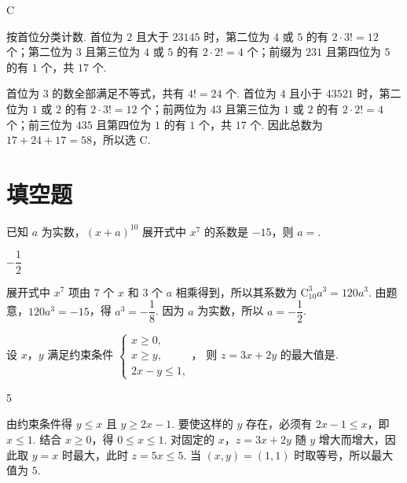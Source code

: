 \begin{answer}
C
\end{answer}

\begin{solution}
按首位分类计数. 首位为 \(2\) 且大于 \(23145\) 时，第二位为 \(4\) 或 \(5\) 的有 \(2\cdot3!=12\) 个；第二位为 \(3\) 且第三位为 \(4\) 或 \(5\) 的有 \(2\cdot2!=4\) 个；前缀为 \(231\) 且第四位为 \(5\) 的有 \(1\) 个，共 \(17\) 个.

首位为 \(3\) 的数全部满足不等式，共有 \(4!=24\) 个. 首位为 \(4\) 且小于 \(43521\) 时，第二位为 \(1\) 或 \(2\) 的有 \(2\cdot3!=12\) 个；前两位为 \(43\) 且第三位为 \(1\) 或 \(2\) 的有 \(2\cdot2!=4\) 个；前三位为 \(435\) 且第四位为 \(1\) 的有 \(1\) 个，共 \(17\) 个. 因此总数为 \(17+24+17=58\)，所以选 C.
\end{solution}

\section{填空题}
\begin{problem}
已知 \(a\) 为实数，\((x+a)^{10}\) 展开式中 \(x^7\) 的系数是 \(-15\)，则 \(a=\)\fillinblank{}.
\end{problem}

\begin{answer}
\(-\dfrac{1}{2}\)
\end{answer}

\begin{solution}
展开式中 \(x^7\) 项由 \(7\) 个 \(x\) 和 \(3\) 个 \(a\) 相乘得到，所以其系数为 \(\mathrm C_{10}^{3}a^3=120a^3\). 由题意，\(120a^3=-15\)，得 \(a^3=-\dfrac{1}{8}\). 因为 \(a\) 为实数，所以 \(a=-\dfrac{1}{2}\).
\end{solution}

\begin{problem}
设 \(x\)，\(y\) 满足约束条件
\(\begin{cases}
x\geqslant0,\\
x\geqslant y,\\
2x-y\leqslant1,
\end{cases}\)，
则 \(z=3x+2y\) 的最大值是\fillinblank{}.
\end{problem}

\begin{answer}
5
\end{answer}

\begin{solution}
由约束条件得 \(y\leqslant x\) 且 \(y\geqslant2x-1\). 要使这样的 \(y\) 存在，必须有 \(2x-1\leqslant x\)，即 \(x\leqslant1\). 结合 \(x\geqslant0\)，得 \(0\leqslant x\leqslant1\). 对固定的 \(x\)，\(z=3x+2y\) 随 \(y\) 增大而增大，因此取 \(y=x\) 时最大，此时 \(z=5x\leqslant5\). 当 \((x,y)=(1,1)\) 时取等号，所以最大值为 \(5\).
\end{solution}

